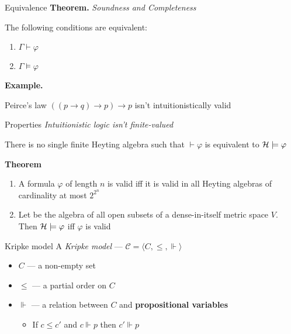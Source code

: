 \documentclass[sans]{beamer}
\begin{document}
\begin{frame}{Equivalence}
  \textbf{Theorem.} \emph{Soundness and Completeness}
  
  The following conditions are equivalent:
  \begin{enumerate}
    \item $\Gamma \vdash \varphi$
    \item $\Gamma \models \varphi$
  \end{enumerate}

  \vfill
  \pause
  \textbf{Example.}
  
  Peirce's law $((p \to q) \to p) \to p$ isn't intuitionistically valid

\end{frame}

\begin{frame}{Properties}
  \emph{Intuitionistic logic isn't finite-valued}

  There is no single finite Heyting algebra \calh such that $\vdash \varphi$ is equivalent to
  $\mathcal{H} \models \varphi$

  \pause
  \vfill
  \textbf{Theorem}
  \begin{enumerate}
    \item A formula $\varphi$ of length $n$ is valid iff it is valid in all Heyting algebras
          of cardinality at most $2^{2^n}$
    \item Let \calh be the algebra of all open subsets of a dense-in-itself metric space $V$.
          Then $\mathcal{H} \models \varphi$ iff $\varphi$ is valid
  \end{enumerate}

\end{frame}

\begin{frame}{Kripke model}
  A \emph{Kripke model} --- $\mathcal{C} = \langle C,\leq,{\Vdash} \rangle$
  \begin{itemize}
    \item $C$ --- a non-empty set
    \item $\leq$ --- a partial order on $C$
    \item $\Vdash$ --- a relation between $C$ and \textbf{propositional variables}
    \begin{itemize}
      \item If $c \leq c'$ and $c \Vdash p$ then $c' \Vdash p$
    \end{itemize}
  \end{itemize}
\end{frame}
\end{document}
